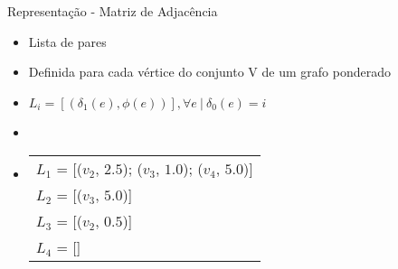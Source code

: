 \begin{frame}{Representação - Matriz de Adjacência}
    \begin{itemize}
        \item Lista de pares
        \item Definida para cada vértice do conjunto V de um grafo ponderado
        \item $L_i = [(\delta_1(e), \phi(e))], \forall e \ | \ \delta_0(e) = i$
        \item []
        \item []
            \begin{tabular}{l}
                    $L_1$ = [($v_2$, $2.5$); ($v_3$, $1.0$); ($v_4$, $5.0$)]\\
                    $L_2$ = [($v_3$, $5.0$)]\\
                    $L_3$ = [($v_2$, $0.5$)]\\
                    $L_4$ = []\\
            \end{tabular}
    \end{itemize}
\end{frame}